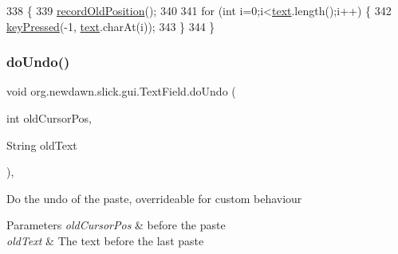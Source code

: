 \begin{DoxyCode}
338                                         \{
339         \mbox{\hyperlink{classorg_1_1newdawn_1_1slick_1_1gui_1_1_text_field_aa8a43b0208ade72337c6d7ed34f07d04}{recordOldPosition}}();
340         
341         \textcolor{keywordflow}{for} (\textcolor{keywordtype}{int} i=0;i<\mbox{\hyperlink{classorg_1_1newdawn_1_1slick_1_1gui_1_1_text_field_af66b269abe9cd0edb7ecb3f492031565}{text}}.length();i++) \{
342             \mbox{\hyperlink{classorg_1_1newdawn_1_1slick_1_1gui_1_1_text_field_abe8804392248db859a452f8bbf0955a1}{keyPressed}}(-1, \mbox{\hyperlink{classorg_1_1newdawn_1_1slick_1_1gui_1_1_text_field_af66b269abe9cd0edb7ecb3f492031565}{text}}.charAt(i));
343         \}
344     \}
\end{DoxyCode}
\mbox{\label{classorg_1_1newdawn_1_1slick_1_1gui_1_1_text_field_acbfbdd0bcfc2ac4e5a1af3acaab5d801}} 
\subsubsection{\texorpdfstring{do\+Undo()}{doUndo()}}
{\footnotesize\ttfamily void org.\+newdawn.\+slick.\+gui.\+Text\+Field.\+do\+Undo (\begin{DoxyParamCaption}\item[{int}]{old\+Cursor\+Pos,  }\item[{String}]{old\+Text }\end{DoxyParamCaption})\hspace{0.3cm}{\ttfamily [inline]}, {\ttfamily [protected]}}

Do the undo of the paste, overrideable for custom behaviour


\begin{DoxyParams}{Parameters}
{\em old\+Cursor\+Pos} & before the paste \\
\hline
{\em old\+Text} & The text before the last paste \\
\hline
\end{DoxyParams}

